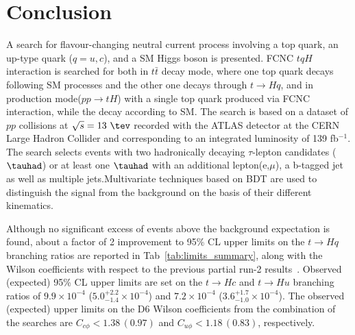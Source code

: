 \section{Conclusion}
\label{sec:conclusion}
A search for flavour-changing neutral current process involving a top quark, an up-type quark ($q=u, c$), and a SM Higgs boson is presented. FCNC $tqH$ interaction is searched for both in $t\bar{t}$ decay mode, where one top quark decays following SM processes and the other one decays through $t\rightarrow Hq$, and in production mode($pp\rightarrow tH$) with a single top quark produced via FCNC interaction, while the decay according to SM. The search is based on a dataset of $pp$ collisions at $\sqrt{s}=13~\tev$ recorded with the ATLAS detector at the CERN Large Hadron Collider and corresponding to an integrated luminosity of 139 fb$^{-1}$. The search selects events with two hadronically decaying $\tau$-lepton candidates ($\tauhad$) or at least one $\tauhad$ with an additional lepton(e,$\mu$), a b-tagged jet as well as multiple jets.Multivariate techniques based on BDT are used to distinguish the signal from the background on the basis of their different kinematics.


Although no significant excess of events above the background expectation is found, about a factor of 2 improvement to 95\% CL upper limits on the $t\to Hq$ branching ratios are reported in Tab~\ref{tab:limits_summary}, along with the Wilson coefficients with respect to the previous partial run-2 results~\cite{Aaboud2019SearchFT}.
Observed (expected) 95\% CL upper limits are set on the $t\to Hc$ and $t\to Hu$ branching ratios of $9.9\times10^{-4}$ ($5.0^{+2.2}_{-1.4}\times10^{-4}$) and $7.2\times10^{-4}$ ($3.6^{+1.7}_{-1.0}\times10^{-4}$). The observed (expected) upper limits on the D6 Wilson coefficients from the combination of the searches are $C_{c\phi}<1.38\,(0.97)$ and $C_{u\phi}<1.18\,(0.83)$, respectively.
